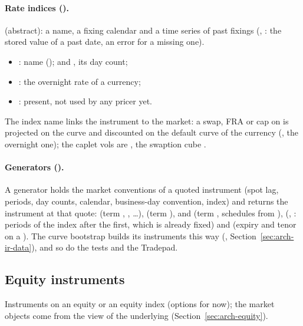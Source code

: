 \paragraph{Rate indices ().}  (abstract): a name, a fixing calendar and a time series of
past fixings (, : the stored value of a past date, an error for a missing one).
\begin{itemize}[nosep]
  \item {}: name 
        ();  and , its day count;
  \item {}: the overnight rate of a currency;
  \item {}: present, not used by any pricer yet.
\end{itemize}
The index name links the instrument to the market: a swap, FRA or cap on  is projected on the curve
 and discounted on the default curve of the currency (, the
overnight one); the caplet vols are , the swaption cube .

\paragraph{Generators ().} A generator holds the market conventions of a quoted
instrument (spot lag, periods, day counts, calendar, business-day convention, index) and  returns the instrument at that quote:  (term , , \dots),
 (term ),  and  (term , schedules
from ),  (, : periods of the index
after the first, which is already fixed) and  (expiry and tenor on a ). The
curve bootstrap builds its instruments this way (, Section~\ref{sec:arch-ir-data}), and so do
the tests and the Tradepad.

\subsection{Equity instruments}\label{sec:arch-equity-instruments}\label{sec:arch-equity-options}
Instruments on an equity or an equity index (options for now); the market objects come from the  view of
the underlying (Section~\ref{sec:arch-equity}).

